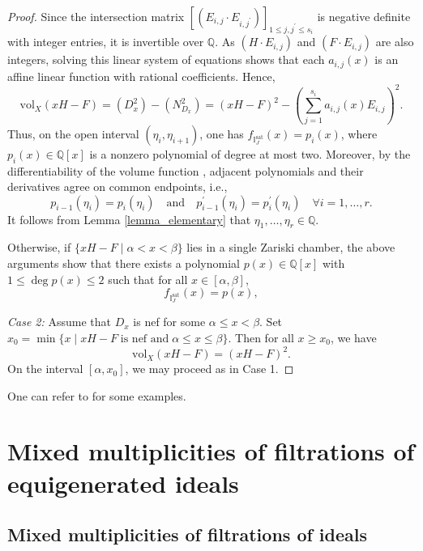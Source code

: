 \documentclass[12pt,a4paper]{amsart}
\theoremstyle{plain}
\theoremstyle{definition}
\numberwithin{equation}{theorem}
\begin{document}
\begin{proof}
Since the intersection matrix $[(E_{i,j}\cdot E_{i,j^{\prime}})]_{1\leq j,j^{\prime}\leq s_i}$ is negative definite with integer entries, it is invertible over $\mathbb{Q}$. As $(H\cdot E_{i,j})$ and $(F\cdot E_{i,j})$ are also integers, solving this linear system of equations shows that each $a_{i,j}(x)$ is an affine linear function with rational coefficients. Hence, $$\mathrm{vol}_X(xH-F) = (D_x^2) - (N_{D_x}^2) = (xH-F)^2 - \left(\sum_{j=1}^{s_i}a_{i,j}(x)E_{i,j}\right)^2.$$ Thus, on the open interval $(\eta_{i},\eta_{i+1})$, one has $f_{\mathbb{I}^{\mathrm{sat}}_J}(x)=p_{i}(x)$, where $p_i(x)\in\mathbb{Q}[x]$ is a nonzero polynomial of degree at most two. Moreover, by the differentiability of the volume function \cite[Corollary 4.27]{LM09}, adjacent polynomials and their derivatives agree on common endpoints, i.e., $$p_{i-1}(\eta_i)=p_i(\eta_i) \quad\text{and}\quad p^{\prime}_{i-1}(\eta_i)=p^{\prime}_i(\eta_i) \quad \forall i=1,\ldots,r.$$ It follows from Lemma \ref{lemma_elementary} that $\eta_1,\ldots,\eta_r \in \mathbb{Q}$.

Otherwise, if $\{xH-F \mid \alpha< x<\beta\}$ lies in a single Zariski chamber, the above arguments show that there exists a polynomial $p(x)\in\mathbb{Q}[x]$ with $1\leq\deg p(x)\leq 2$ such that for all $x\in [\alpha,\beta]$, $$f_{\mathbb{I}^{\mathrm{sat}}_J}(x)=p(x),$$

\emph{Case 2:} Assume that $D_x$ is nef for some $\alpha\leq x<\beta$. Set $x_0 = \min\{x \mid xH-F \;\text{is nef and}\;\alpha\leq x\leq \beta\}$. Then for all $x\geq x_0$, we have $$\mathrm{vol}_X(xH-F) = (xH-F)^2.$$ On the interval $[\alpha,x_0]$, we may proceed as in Case 1.
\end{proof}

One can refer to \cite[Section 7]{DRT25} for some examples.

\section{Mixed multiplicities of filtrations of equigenerated ideals}\label{section 8}

\subsection{Mixed multiplicities of filtrations of ideals}
\end{document}
